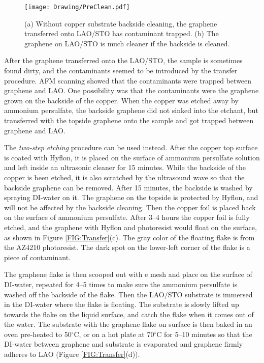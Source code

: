\documentclass[pdflatex, sectionletters, 12pt]{pittetd}    %
\begin{document}
\begin{figure}[h!]
	\centering
	\texttt{[image: Drawing/PreClean.pdf]}
	\caption{(a) Without copper substrate backside cleaning, the graphene transferred onto LAO/STO has contaminant trapped. (b) The graphene on LAO/STO is much cleaner if the backside is cleaned.}
	\label{FIG:PreClean}
\end{figure}

After the graphene transferred onto the LAO/STO, the sample is sometimes found dirty, and the contaminants seemed to be introduced by the transfer procedure. AFM scanning showed that the contaminants were trapped between graphene and LAO. One possibility was that the contaminants were the graphene grown on the backside of the copper. When the copper was etched away by ammonium persulfate, the backside graphene did not sinked into the etchant, but transferred with the topside graphene onto the sample and got trapped between graphene and LAO. 

The \emph{two-step etching} procedure can be used instead. After the copper top surface is coated with Hyflon, it is placed on the surface of ammonium persulfate solution and left inside an ultrasonic cleaner for 15 minutes. While the backside of the copper is been etched, it is also scratched by the ultrasound wave so that the backside graphene can be removed. After 15 minutes, the backside is washed by spraying DI-water on it. The graphene on the topside is protected by Hyflon, and will not be affected by the backside cleaning. Then the copper foil is placed back on the surface of ammonium persulfate. After 3--4 hours the copper foil is fully etched, and the graphene with Hyflon and photoresist would float on the surface, as shown in Figure \ref{FIG:Transfer}(c). The gray color of the floating flake is from the AZ4210 photoresist. The dark spot on the lower-left corner of the flake is a piece of contaminant. 

The graphene flake is then scooped out with e mesh and place on the surface of DI-water, repeated for 4--5 times to make sure the ammonium persulfate is washed off the backside of the flake. Then the LAO/STO substrate is immersed in the DI-water where the flake is floating. The substrate is slowly lifted up towards the flake on the liquid surface, and catch the flake when it comes out of the water. The substrate with the graphene flake on surface is then baked in an oven pre-heated to 50$^{\circ}$C, or on a hot plate at 70$^{\circ}$C for 5--10 minutes so that the DI-water between graphene and substrate is evaporated and graphene firmly adheres to LAO (Figure \ref{FIG:Transfer}(d)).
\end{document}

